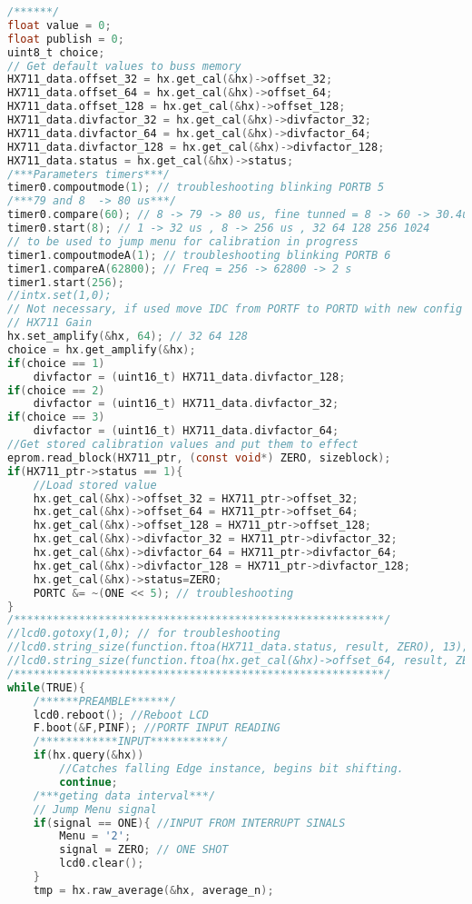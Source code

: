 \begin{lstlisting}[language=C, caption={main.c}, label=main-c, captionpos=b]
/******/
float value = 0;
float publish = 0;
uint8_t choice;
// Get default values to buss memory
HX711_data.offset_32 = hx.get_cal(&hx)->offset_32;
HX711_data.offset_64 = hx.get_cal(&hx)->offset_64;
HX711_data.offset_128 = hx.get_cal(&hx)->offset_128;
HX711_data.divfactor_32 = hx.get_cal(&hx)->divfactor_32;
HX711_data.divfactor_64 = hx.get_cal(&hx)->divfactor_64;
HX711_data.divfactor_128 = hx.get_cal(&hx)->divfactor_128;
HX711_data.status = hx.get_cal(&hx)->status;
/***Parameters timers***/
timer0.compoutmode(1); // troubleshooting blinking PORTB 5
/***79 and 8  -> 80 us***/
timer0.compare(60); // 8 -> 79 -> 80 us, fine tunned = 8 -> 60 -> 30.4us
timer0.start(8); // 1 -> 32 us , 8 -> 256 us , 32 64 128 256 1024
// to be used to jump menu for calibration in progress
timer1.compoutmodeA(1); // troubleshooting blinking PORTB 6
timer1.compareA(62800); // Freq = 256 -> 62800 -> 2 s
timer1.start(256);
//intx.set(1,0);
// Not necessary, if used move IDC from PORTF to PORTD with new config pinage.
// HX711 Gain
hx.set_amplify(&hx, 64); // 32 64 128
choice = hx.get_amplify(&hx);
if(choice == 1)
	divfactor = (uint16_t) HX711_data.divfactor_128;
if(choice == 2)
	divfactor = (uint16_t) HX711_data.divfactor_32;
if(choice == 3)
	divfactor = (uint16_t) HX711_data.divfactor_64;
//Get stored calibration values and put them to effect
eprom.read_block(HX711_ptr, (const void*) ZERO, sizeblock);
if(HX711_ptr->status == 1){
	//Load stored value 
	hx.get_cal(&hx)->offset_32 = HX711_ptr->offset_32;
	hx.get_cal(&hx)->offset_64 = HX711_ptr->offset_64;
	hx.get_cal(&hx)->offset_128 = HX711_ptr->offset_128;
	hx.get_cal(&hx)->divfactor_32 = HX711_ptr->divfactor_32;
	hx.get_cal(&hx)->divfactor_64 = HX711_ptr->divfactor_64;
	hx.get_cal(&hx)->divfactor_128 = HX711_ptr->divfactor_128;
	hx.get_cal(&hx)->status=ZERO;
	PORTC &= ~(ONE << 5); // troubleshooting
}
/*********************************************************/
//lcd0.gotoxy(1,0); // for troubleshooting
//lcd0.string_size(function.ftoa(HX711_data.status, result, ZERO), 13);
//lcd0.string_size(function.ftoa(hx.get_cal(&hx)->offset_64, result, ZERO), 13);
/*********************************************************/
while(TRUE){
	/******PREAMBLE******/
	lcd0.reboot(); //Reboot LCD
	F.boot(&F,PINF); //PORTF INPUT READING
	/************INPUT***********/
	if(hx.query(&hx)) 
		//Catches falling Edge instance, begins bit shifting.
		continue;
	/***geting data interval***/
	// Jump Menu signal
	if(signal == ONE){ //INPUT FROM INTERRUPT SINALS
		Menu = '2';
		signal = ZERO; // ONE SHOT
		lcd0.clear();
	}
	tmp = hx.raw_average(&hx, average_n); 

\end{lstlisting}

